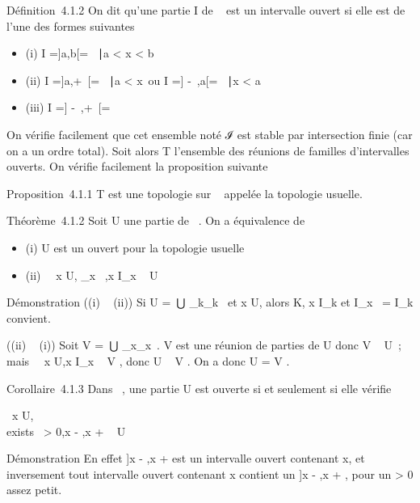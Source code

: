 \documentclass[]{article}
\begin{document}
Définition~4.1.2 On dit qu'une partie I de ~ est un intervalle ouvert si
elle est de l'une des formes suivantes

\begin{itemize}
\itemsep1pt\parskip0pt
\item
  (i) I ={]}a,b{[}= \x \in {}~∣a
  \textless{} x \textless{} b\
\item
  (ii) I ={]}a,+\infty~{[}= \x \in
  ~∣a \textless{} x\ ou I
  ={]} -\infty~,a{[}= \x \in {}~∣x
  \textless{} a\
\item
  (iii) I ={]} -\infty~,+\infty~{[}= ~
\end{itemize}

On vérifie facilement que cet ensemble noté ℐ est stable par
intersection finie (car on a un ordre total). Soit alors T l'ensemble
des réunions de familles d'intervalles ouverts. On vérifie facilement la
proposition suivante

Proposition~4.1.1 T est une topologie sur ~ appelée la topologie
usuelle.

Théorème~4.1.2 Soit U une partie de ~. On a équivalence de

\begin{itemize}
\itemsep1pt\parskip0pt
\item
  (i) U est un ouvert pour la topologie usuelle
\item
  (ii) \forall~~x \in U,
  \existsI_x~ ,\quad x \in
  I_x \subset~ U
\end{itemize}

Démonstration ((i) \rigtharrow~ (ii)) Si U =\
⋃  _k\inKI_k~ et x \in U, alors
\existsk \in K, x \in I_k et I_x~ =
I_k convient.

((ii) \rigtharrow~ (i)) Soit V =\
⋃  _x\inUI_x~. V est une
réunion de parties de U donc V \subset~ U~; mais \forall~~x \in
U,x \in I_x \subset~ V , donc U \subset~ V . On a donc U = V \inT.

Corollaire~4.1.3 Dans ~, une partie U est ouverte si et seulement si
elle vérifie

\forall~x \in U, \\exists~\epsilon
\textgreater{} 0,\quad {]}x - \epsilon,x + \epsilon{[}\subset~ U

Démonstration En effet {]}x - \epsilon,x + \epsilon{[} est un intervalle ouvert
contenant x, et inversement tout intervalle ouvert contenant x contient
un {]}x - \epsilon,x + \epsilon{[}, pour un \epsilon \textgreater{} 0 assez petit.
\end{document}
